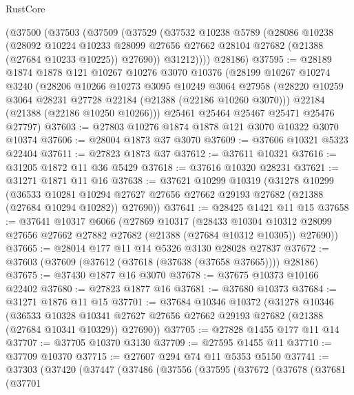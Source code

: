 \begin{lexlean}{RustCore}
\begin{coremodule}
    (@37500
      (@37503
        (@37509
          (@37529
            (@37532
              @10238
              @5789
              (@28086
                @10238
                (@28092
                  @10224
                  @10233
                  @28099
                  @27656
                  @27662
                  @28104
                  @27682
                  (@21388 (@27684 @10233 @10225))
                  @27690))
              @31212))))
      @28186)
@37595 := @28189
    @1874
    @1878
    @121
    @10267
    @10276
    @3070
    @10376
    (@28199
      @10267
      @10274
      @3240
      (@28206
        @10266
        @10273
        @3095
        @10249
        @3064
        @27958
        (@28220 @10259 @3064 @28231 @27728 @22184 (@21388 (@22186 @10260 @3070)))
        @22184
        (@21388 (@22186 @10250 @10266)))
      @25461
      @25464
      @25467
      @25471
      @25476
      @27797)
@37603 := @27803 @10276 @1874 @1878 @121 @3070 @10322 @3070 @10374
@37606 := @28004 @1873 @37 @3070
@37609 := @37606 @10321 @5323 @22404
@37611 := @27823 @1873 @37
@37612 := @37611 @10321
@37616 := @31205 @1872 @11 @36 @5429
@37618 := @37616 @10320 @28231
@37621 := @31271 @1871 @11 @16
@37638 := @37621
    @10299
    @10319
    (@31278
      @10299
      (@36533
        @10281
        @10294
        @27627
        @27656
        @27662
        @29193
        @27682
        (@21388 (@27684 @10294 @10282))
        @27690))
@37641 := @28425 @1421 @11 @15
@37658 := @37641
    @10317
    @6066
    (@27869
      @10317
      (@28433
        @10304
        @10312
        @28099
        @27656
        @27662
        @27882
        @27682
        (@21388 (@27684 @10312 @10305))
        @27690))
@37665 := @28014 @177 @11 @14 @5326 @3130 @28028 @27837
@37672 := @37603 (@37609 (@37612 (@37618 (@37638 (@37658 @37665)))) @28186)
@37675 := @37430 @1877 @16 @3070
@37678 := @37675 @10373 @10166 @22402
@37680 := @27823 @1877 @16
@37681 := @37680 @10373
@37684 := @31271 @1876 @11 @15
@37701 := @37684
    @10346
    @10372
    (@31278
      @10346
      (@36533
        @10328
        @10341
        @27627
        @27656
        @27662
        @29193
        @27682
        (@21388 (@27684 @10341 @10329))
        @27690))
@37705 := @27828 @1455 @177 @11 @14
@37707 := @37705 @10370 @3130
@37709 := @27595 @1455 @11
@37710 := @37709 @10370
@37715 := @27607 @294 @74 @11 @5353 @5150
@37741 := @37303
    (@37420
      (@37447
        (@37486
          (@37556
            (@37595
              (@37672
                (@37678
                  (@37681
                    (@37701

\end{coremodule}
\end{lexlean}
